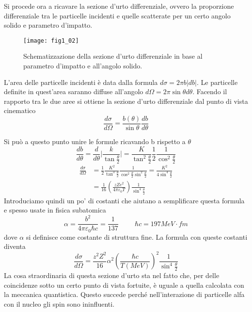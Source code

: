 Si procede ora a ricavare la sezione d'urto differenziale, ovvero la proporzione differenziale tra le particelle incidenti e quelle scatterate per un certo angolo solido e parametro d'impatto. 
\begin{figure}[h]
\centering
\texttt{[image: fig1\_02]}
\caption{Schematizzazione della sezione d'urto differenziale in base al parametro d'impatto e all'angolo solido.}
\label{fig:1.2}
\end{figure}
L'area delle particelle incidenti è data dalla formula $d\sigma=2\pi b |db|$. 
Le particelle definite in quest'area saranno diffuse all'angolo $d\Omega =2\pi \sin\theta d\theta$. 
Facendo il rapporto tra le due aree si ottiene la sezione d'urto differenziale dal punto di vista cinematico
\[\frac{d\sigma}{d\Omega}=\frac{b(\theta)}{\sin\theta}\frac{db}{d\theta}\]

Si può a questo punto unire le formule ricavando b rispetto a $\theta$ 
\[\frac{db}{d\theta}=\frac{d}{d\theta}\biggl|\frac{k}{\tan\frac{\theta}{2}}\biggl|=\frac{K}{\tan^2 \frac{\theta}{2}}\frac{1}{2}\frac{1}{\cos^2\frac{\theta}{2}}\]
\begin{equation}
\begin{split}
\frac{d\sigma}{d\Omega}&=\frac{1}{2}\frac{K^2}{\tan^3 \frac{\theta}{2}}\frac{1}{\cos^2\frac{\theta}{2}\sin^2\frac{\theta}{2}}=\frac{K^2}{4\sin^4\frac{\theta}{2}}\\
&=\frac{1}{16}\left(\frac{zZe^2}{4\pi\varepsilon_0 T}\right)\frac{1}{\sin^4\frac{\theta}{2}}
\end{split}
\end{equation}
Introduciamo quindi un po' di costanti che aiutano a semplificare questa formula e spesso usate in fisica subatomica
\begin{equation}
\alpha=\frac{b^2}{4\pi\varepsilon_0\hbar c}=\frac{1}{137}\hspace{1cm}\hbar c=197 MeV\cdot fm
\end{equation}
dove $\alpha$ si definisce come costante di struttura fine. 
La formula con queste costanti diventa
\begin{equation}
\frac{d\sigma}{d\Omega}=\frac{z^2Z^2}{16}\alpha^2\left(\frac{\hbar c}{T(MeV)}\right)^2 \frac{1}{\sin^4\frac{\theta}{2}}
\end{equation}
La cosa straordinaria di questa sezione d'urto sta nel fatto che, per delle coincidenze sotto un certo punto di vista fortuite, è uguale a quella calcolata con la meccanica quantistica. Questo succede perché nell'interazione di particelle alfa con il nucleo gli spin sono ininfluenti. 

